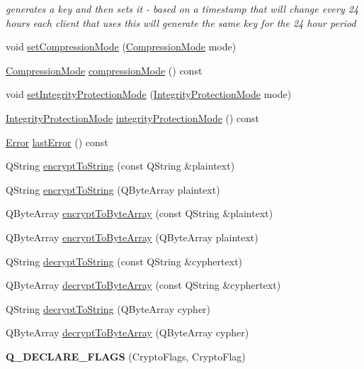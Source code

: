\begin{DoxyCompactItemize}
\begin{DoxyCompactList}\small\item\em generates a key and then sets it -\/ based on a timestamp that will change every 24 hours each client that uses this will generate the same key for the 24 hour period \end{DoxyCompactList}\item 
void \hyperlink{class_simple_crypt_adc6c6355aa276c0d3516f7ad273f063b}{set\+Compression\+Mode} (\hyperlink{class_simple_crypt_a25298e746f175cf175a18f082092ca8e}{Compression\+Mode} mode)
\item 
\hyperlink{class_simple_crypt_a25298e746f175cf175a18f082092ca8e}{Compression\+Mode} \hyperlink{class_simple_crypt_a303253756b925678e53bafc8b72a4e96}{compression\+Mode} () const 
\item 
void \hyperlink{class_simple_crypt_a4fef5e6d3246ee57d6a7b68475b12b8b}{set\+Integrity\+Protection\+Mode} (\hyperlink{class_simple_crypt_a42a5172e558d346b28421cc4e85feb2d}{Integrity\+Protection\+Mode} mode)
\item 
\hyperlink{class_simple_crypt_a42a5172e558d346b28421cc4e85feb2d}{Integrity\+Protection\+Mode} \hyperlink{class_simple_crypt_a81929610d0fd5667db83603f396ddb66}{integrity\+Protection\+Mode} () const 
\item 
\hyperlink{class_simple_crypt_ab7f81049e78f021b55a36f7cfac5a09b}{Error} \hyperlink{class_simple_crypt_a123562e29377ab26e3b398b588f596d9}{last\+Error} () const 
\item 
Q\+String \hyperlink{class_simple_crypt_af26a3d3c6cef9732190c1d2c6a53a5b5}{encrypt\+To\+String} (const Q\+String \&plaintext)
\item 
Q\+String \hyperlink{class_simple_crypt_aa72b79bf7a5bb971bf3b0a52b9247efd}{encrypt\+To\+String} (Q\+Byte\+Array plaintext)
\item 
Q\+Byte\+Array \hyperlink{class_simple_crypt_ae1991c7748b2bb74468bee0be372d2c4}{encrypt\+To\+Byte\+Array} (const Q\+String \&plaintext)
\item 
Q\+Byte\+Array \hyperlink{class_simple_crypt_a741305d04e86bcb7d4625b05bf234887}{encrypt\+To\+Byte\+Array} (Q\+Byte\+Array plaintext)
\item 
Q\+String \hyperlink{class_simple_crypt_aa454cf372b534fd5ffaa2c5bd0fa57ea}{decrypt\+To\+String} (const Q\+String \&cyphertext)
\item 
Q\+Byte\+Array \hyperlink{class_simple_crypt_ad6785e087d449a1aa80c39248e98fcda}{decrypt\+To\+Byte\+Array} (const Q\+String \&cyphertext)
\item 
Q\+String \hyperlink{class_simple_crypt_ad1a3257cefee43773803ec1b12654f92}{decrypt\+To\+String} (Q\+Byte\+Array cypher)
\item 
Q\+Byte\+Array \hyperlink{class_simple_crypt_a4babb69e45849f672574a26b6433c85a}{decrypt\+To\+Byte\+Array} (Q\+Byte\+Array cypher)
\item 
\hypertarget{class_simple_crypt_a710fb3871372ccddd6450f73afca24eb}{}{\bfseries Q\+\_\+\+D\+E\+C\+L\+A\+R\+E\+\_\+\+F\+L\+A\+G\+S} (Crypto\+Flags, Crypto\+Flag)\label{class_simple_crypt_a710fb3871372ccddd6450f73afca24eb}

\end{DoxyCompactItemize}
